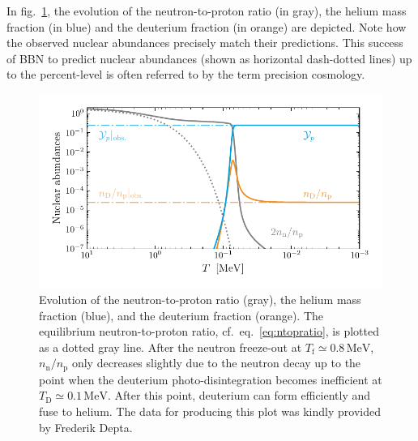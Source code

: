 In fig.~\ref{fig:bbnsm}, the evolution of the neutron-to-proton ratio (in gray), the helium mass fraction (in blue) and the deuterium fraction (in orange) are depicted. Note how the observed nuclear abundances   precisely match their predictions. This success of \ac{BBN} to predict nuclear abundances (shown as horizontal dash-dotted lines) up to the percent-level is often referred to by the term precision cosmology.

\begin{figure}[t]
	\centering
	\includegraphics[width=\linewidth]{thesisplots/alteralterbbn_carlo/bbn_sm}
	\caption{Evolution of the neutron-to-proton ratio ({\color{gray}gray}), the helium mass fraction ({\color{DESYcyan}blue}), and the deuterium fraction ({\color{DESYorange}orange}). The equilibrium neutron-to-proton ratio, cf.~eq.~\eqref{eq:ntopratio}, is plotted as a dotted gray line. After the neutron freeze-out at $T_\text{f} \simeq 0.8 \, \text{MeV}$, $n_\text{n}/n_\text{p}$ only decreases slightly due to the neutron decay up to the point when the deuterium photo-disintegration becomes inefficient at $T_\text{D} \simeq 0.1 \, \text{MeV}$. After this point, deuterium can form efficiently and fuse to helium. The data for producing this plot was kindly provided by Frederik Depta.}
	\label{fig:bbnsm}
\end{figure}

